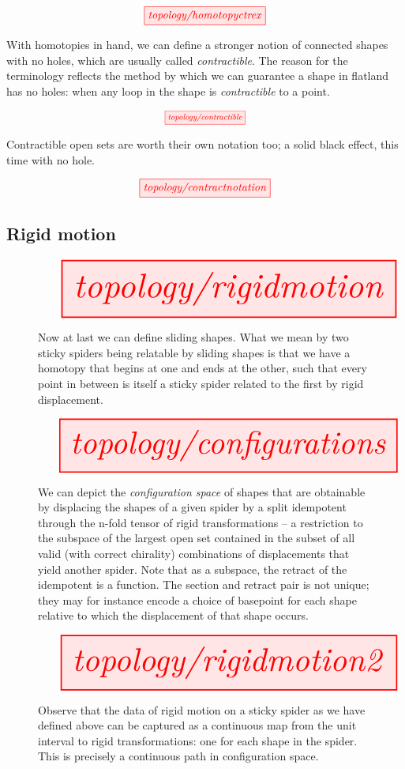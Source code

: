 \[\tikzfig{topology/homotopyctrex}\]


With homotopies in hand, we can define a stronger notion of connected shapes with no holes, which are usually called \emph{contractible}. The reason for the terminology reflects the method by which we can guarantee a shape in flatland has no holes: when any loop in the shape is \emph{contractible} to a point.

\[\scalebox{0.75}{\tikzfig{topology/contractible}}\]

Contractible open sets are worth their own notation too; a solid black effect, this time with no hole.

\[\tikzfig{topology/contractnotation}\]

\subsection{Rigid motion}\label{sec:rigidmotion}

\begin{figure}[h!]
\centering
\[\resizebox{\textwidth}{!}{\tikzfig{topology/rigidmotion}}\]
\caption{
Now at last we can define sliding shapes. What we mean by two sticky spiders being relatable by sliding shapes is that we have a homotopy that begins at one and ends at the other, such that every point in between is itself a sticky spider related to the first by rigid displacement.}
\end{figure}


\begin{figure}[h!]\label{fig:configurationspace}
\centering
\[\resizebox{\textwidth}{!}{\tikzfig{topology/configurations}}\]
\caption{
We can depict the \emph{configuration space} of shapes that are obtainable by displacing the shapes of a given spider by a split idempotent through the n-fold tensor of rigid transformations -- a restriction to the subspace of the largest open set contained in the subset of all valid (with correct chirality) combinations of displacements that yield another spider. Note that as a subspace, the retract of the idempotent is a function. The section and retract pair is not unique; they may for instance encode a choice of basepoint for each shape relative to which the displacement of that shape occurs.}
\end{figure}

\begin{figure}[h!]
\centering
\[\resizebox{\textwidth}{!}{\tikzfig{topology/rigidmotion2}}\]
\caption{Observe that the data of rigid motion on a sticky spider as we have defined above can be captured as a continuous map from the unit interval to rigid transformations: one for each shape in the spider. This is precisely a continuous path in configuration space.}
\end{figure}

